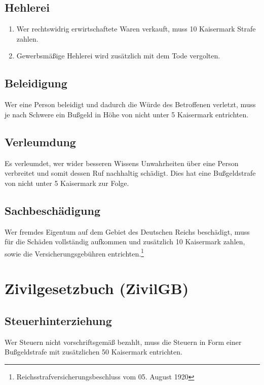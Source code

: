 \documentclass{article}
\begin{document}
\subsection{Hehlerei}
\begin{enumerate}[(1)]
    \item Wer rechtswidrig erwirtschaftete Waren verkauft, muss 10 Kaisermark Strafe zahlen.
    \item Gewerbsmäßige Hehlerei wird zusätzlich mit dem Tode vergolten.
\end{enumerate}

\subsection{Beleidigung}
Wer eine Person beleidigt und dadurch die Würde des Betroffenen verletzt, muss je nach Schwere ein Bußgeld in Höhe von nicht unter 5 Kaisermark entrichten.

\subsection{Verleumdung}
Es verleumdet, wer wider besseren Wissens Unwahrheiten über eine Person verbreitet und somit dessen Ruf nachhaltig schädigt. Dies hat eine Bußgeldstrafe von nicht unter 5 Kaisermark zur Folge.

\subsection{Sachbeschädigung}
Wer fremdes Eigentum auf dem Gebiet des Deutschen Reichs beschädigt, muss für die Schäden vollständig aufkommen und zusätzlich 10 Kaisermark zahlen, sowie die Versicherungsgebühren entrichten.\footnote{Reichsstrafversicherungsbeschluss vom 05. August 1920}

\newpage
\section{Zivilgesetzbuch (ZivilGB)}
\localtableofcontents

\subsection{Steuerhinterziehung}\label{hinterz}
Wer Steuern nicht vorschriftsgemäß bezahlt, muss die Steuern in Form einer Bußgeldstrafe mit zusätzlichen 50 Kaisermark entrichten.
\end{document}
